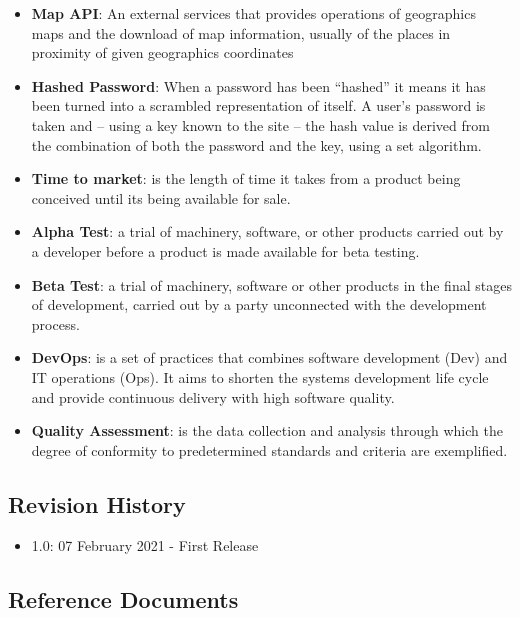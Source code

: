 \begin{itemize}
    \item \textbf{Map API}: An external services that provides operations of geographics maps and the download of map information, usually of the places in proximity of given geographics coordinates
    \item \textbf{Hashed Password}: When a password has been “hashed” it means it has been turned into a scrambled representation of itself. A user's password is taken and – using a key known to the site – the hash value is derived from the combination of both the password and the key, using a set algorithm.
    \item \textbf{Time to market}: is the length of time it takes from a product being conceived until its being available for sale.
    \item \textbf{Alpha Test}: a trial of machinery, software, or other products carried out by a developer before a product is made available for beta testing.
    \item \textbf{Beta Test}: a trial of machinery, software or other products in the final stages of development, carried out by a party unconnected with the development process.
    \item \textbf{DevOps}: is a set of practices that combines software development (Dev) and IT operations (Ops). It aims to shorten the systems development life cycle and provide continuous delivery with high software quality.
    \item \textbf{Quality Assessment}: is the data collection and analysis through which the degree of conformity to predetermined standards and criteria are exemplified.
\end{itemize}

\subsection{Revision History}

\begin{itemize}
    \item 1.0: 07 February 2021 - First Release
\end{itemize}

\subsection{Reference Documents}

